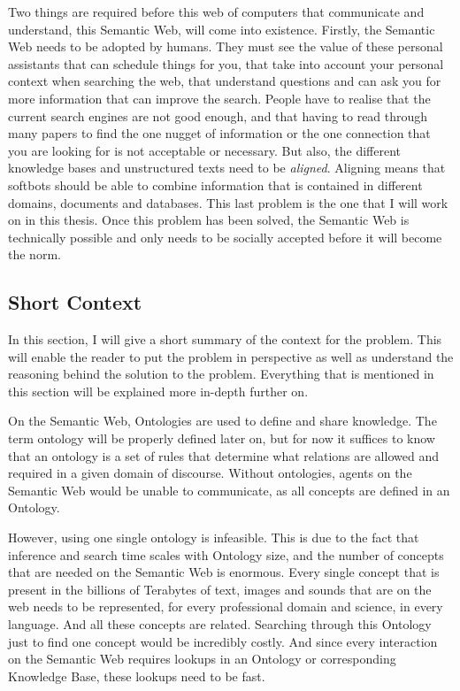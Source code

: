 \documentclass{article}
\begin{document}
 Two things are required before this web of computers that communicate and understand, this Semantic Web, will come into existence. 
 Firstly, the Semantic Web needs to be adopted by humans. They must see the value of these personal assistants that can schedule things for you, that take into account your personal context when searching the web, that understand questions and can ask you for more information that can improve the search. People have to realise that the current search engines are not good enough, and that having to read through many papers to find the one nugget of information or the one connection that you are looking for is not acceptable or necessary.
 But also, the different knowledge bases and unstructured texts need to be \emph{aligned}. Aligning means that softbots should be able to combine information that is contained in different domains, documents and databases. This last problem is the one that I will work on in this thesis. Once this problem has been solved, the Semantic Web is technically possible and only needs to be socially accepted before it will become the norm.

 \subsection{Short Context}
 In this section, I will give a short summary of the context for the problem. This will enable the reader to put the problem in perspective as well as understand the reasoning behind the solution to the problem. Everything that is mentioned in this section will be explained more in-depth further on.
 
 On the Semantic Web, Ontologies are used to define and share knowledge. The term ontology will be properly defined later on, but for now it suffices to know that an ontology is a set of rules that determine what relations are allowed and required in a given domain of discourse. Without ontologies, agents on the Semantic Web would be unable to communicate, as all concepts are defined in an Ontology.
 
 However, using one single ontology is infeasible. This is due to the fact that inference and search time scales with Ontology size, and the number of concepts that are needed on the Semantic Web is enormous. Every single concept that is present in the billions of Terabytes of text, images and sounds that are on the web needs to be represented, for every professional domain and science, in every language. And all these concepts are related. Searching through this Ontology just to find one concept would be incredibly costly. And since every interaction on the Semantic Web requires lookups in an Ontology or corresponding Knowledge Base, these lookups need to be fast.
 
\end{document}
